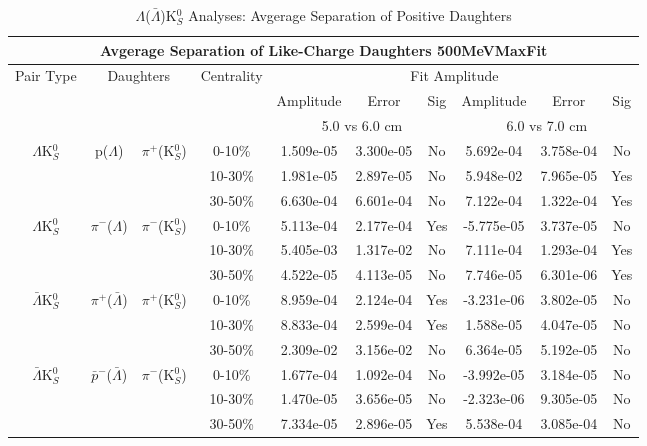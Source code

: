 \documentclass[../AnalysisNoteJBuxton.tex]{subfiles}
\begin{document}
\begin{table}
 \centering
 \begin{tabular}{|c|c|c|c|c|c|c||c|c|c|}
 \multicolumn{10}{c}{Avgerage Separation of Like-Charge Daughters 500MeVMaxFit} \\
  \hline
  \multirow{3}{*}{Pair Type} & \multicolumn{2}{c|}{\multirow{3}{*}{Daughters}} & \multirow{3}{*}{Centrality} & \multicolumn{6}{c|}{Fit Amplitude} \\
  \cline{5-10}
   & \multicolumn{2}{c|}{} & & Amplitude & Error & Sig & Amplitude & Error & Sig \\  
  \cline{5-10}
   & \multicolumn{2}{c|}{} & & \multicolumn{3}{c||}{5.0 vs 6.0 cm} & \multicolumn{3}{c|}{6.0 vs 7.0 cm} \\  
  \hline
  \multirow{3}{*}{$\Lambda$K$^{0}_{S}$} & \multirow{3}{*}{p($\Lambda$)} & \multirow{3}{*}{$\pi^{+}$(K$^{0}_{S}$)}
   &      0-10\% & 1.509e-05 & 3.300e-05 & No & 5.692e-04 & 3.758e-04 & No \\
   & & & 10-30\% & 1.981e-05 & 2.897e-05 & No & 5.948e-02 & 7.965e-05 & Yes \\
   & & & 30-50\% & 6.630e-04 & 6.601e-04 & No & 7.122e-04 & 1.322e-04 & Yes \\
  \hline
  \multirow{3}{*}{$\Lambda$K$^{0}_{S}$} & \multirow{3}{*}{$\pi^{-}$($\Lambda$)} & \multirow{3}{*}{$\pi^{-}$(K$^{0}_{S}$) }
   &      0-10\% & 5.113e-04 & 2.177e-04 & Yes & -5.775e-05 & 3.737e-05 & No \\
   & & & 10-30\% & 5.405e-03 & 1.317e-02 & No & 7.111e-04 & 1.293e-04 & Yes \\
   & & & 30-50\% & 4.522e-05 & 4.113e-05 & No & 7.746e-05 & 6.301e-06 & Yes \\
  \hline \hline
  \multirow{3}{*}{$\bar{\Lambda}$K$^{0}_{S}$} & \multirow{3}{*}{$\pi^{+}$($\bar{\Lambda}$)} & \multirow{3}{*}{$\pi^{+}$(K$^{0}_{S}$)} 
   &      0-10\% & 8.959e-04 & 2.124e-04 & Yes & -3.231e-06 & 3.802e-05 & No \\
   & & & 10-30\% & 8.833e-04 & 2.599e-04 & Yes & 1.588e-05 & 4.047e-05 & No \\
   & & & 30-50\% & 2.309e-02 & 3.156e-02 & No & 6.364e-05 & 5.192e-05 & No \\
  \hline
  \multirow{3}{*}{$\bar{\Lambda}$K$^{0}_{S}$} & \multirow{3}{*}{$\bar{p}^{-}$($\bar{\Lambda}$)} & \multirow{3}{*}{$\pi^{-}$(K$^{0}_{S}$)}
   &      0-10\% & 1.677e-04 & 1.092e-04 & No & -3.992e-05 & 3.184e-05 & No \\
   & & & 10-30\% & 1.470e-05 & 3.656e-05 & No & -2.323e-06 & 9.305e-05 & No \\
   & & & 30-50\% & 7.334e-05 & 2.896e-05 & Yes & 5.538e-04 & 3.085e-04 & No \\
  \hline
 \end{tabular}
 \caption{$\Lambda$($\bar{\Lambda}$)K$^{0}_{S}$ Analyses: Avgerage Separation of Positive Daughters}
 \label{tab:AvgSepLamK0_500MeVMaxFit}
\end{table}
\end{document}
